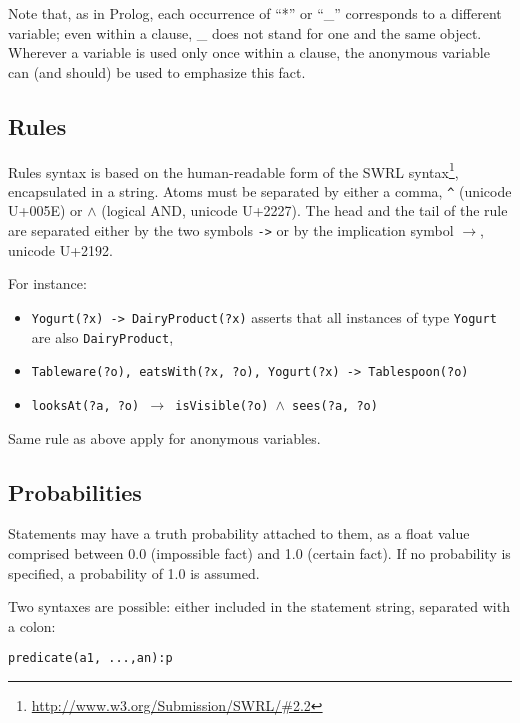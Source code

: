 Note that, as in Prolog, each occurrence of ``*'' or ``\_'' corresponds to a
different variable; even within a clause, \_ does not stand for one and the same
object. Wherever a variable is used only once within a clause, the anonymous
variable can (and should) be used to emphasize this fact.

\subsection{Rules}

Rules syntax is based on the human-readable form of the SWRL
syntax\footnote{\url{http://www.w3.org/Submission/SWRL/\#2.2}}, encapsulated
in a string. Atoms must be separated by either a comma, \texttt{\^{ }} (unicode
U+005E) or \texttt{{$\land$}} (logical AND, unicode U+2227). The head and the 
tail of the rule are separated either by the two symbols \texttt{->} or by the
implication symbol \texttt{$\to$}, unicode U+2192.

For instance:

\begin{itemize}

    \item {\tt Yogurt(?x) -> DairyProduct(?x)} asserts that all instances of type
    {\tt Yogurt} are also {\tt DairyProduct},

    \item {\tt Tableware(?o), eatsWith(?x, ?o), Yogurt(?x) -> Tablespoon(?o)}

    \item {\tt looksAt(?a, ?o) $\to$ isVisible(?o) $\land$ sees(?a, ?o)}

\end{itemize}

Same rule as above apply for anonymous variables.

\subsection{Probabilities}

Statements may have a truth probability attached to them, as a float value
comprised between 0.0 (impossible fact) and 1.0 (certain fact). If no
probability is specified, a probability of 1.0 is assumed.

Two syntaxes are possible: either included in the statement string, separated
with a colon:

\begin{center} \tt predicate(a1, ...,an):p \end{center}

